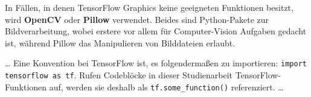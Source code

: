 In Fällen, in denen TensorFlow Graphics keine geeigneten Funktionen besitzt, wird \textbf{OpenCV} oder \textbf{Pillow} verwendet. Beides sind Python-Pakete zur Bildverarbeitung, wobei erstere vor allem für Computer-Vision Aufgaben gedacht ist, während Pillow das Manipulieren von Bilddateien erlaubt. \cite{opencv} \cite{pillow}


\dots
Eine Konvention bei TensorFlow ist, es folgendermaßen zu importieren: \texttt{import tensorflow as tf}. Rufen Codeblöcke in dieser Studienarbeit TensorFlow-Funktionen auf, werden sie deshalb als \texttt{tf.some_function()} referenziert.
\dots